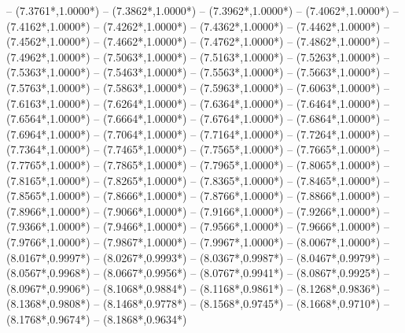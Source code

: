 {	-- ({7.3761*\dx},{1.0000*\dy})
	-- ({7.3862*\dx},{1.0000*\dy})
	-- ({7.3962*\dx},{1.0000*\dy})
	-- ({7.4062*\dx},{1.0000*\dy})
	-- ({7.4162*\dx},{1.0000*\dy})
	-- ({7.4262*\dx},{1.0000*\dy})
	-- ({7.4362*\dx},{1.0000*\dy})
	-- ({7.4462*\dx},{1.0000*\dy})
	-- ({7.4562*\dx},{1.0000*\dy})
	-- ({7.4662*\dx},{1.0000*\dy})
	-- ({7.4762*\dx},{1.0000*\dy})
	-- ({7.4862*\dx},{1.0000*\dy})
	-- ({7.4962*\dx},{1.0000*\dy})
	-- ({7.5063*\dx},{1.0000*\dy})
	-- ({7.5163*\dx},{1.0000*\dy})
	-- ({7.5263*\dx},{1.0000*\dy})
	-- ({7.5363*\dx},{1.0000*\dy})
	-- ({7.5463*\dx},{1.0000*\dy})
	-- ({7.5563*\dx},{1.0000*\dy})
	-- ({7.5663*\dx},{1.0000*\dy})
	-- ({7.5763*\dx},{1.0000*\dy})
	-- ({7.5863*\dx},{1.0000*\dy})
	-- ({7.5963*\dx},{1.0000*\dy})
	-- ({7.6063*\dx},{1.0000*\dy})
	-- ({7.6163*\dx},{1.0000*\dy})
	-- ({7.6264*\dx},{1.0000*\dy})
	-- ({7.6364*\dx},{1.0000*\dy})
	-- ({7.6464*\dx},{1.0000*\dy})
	-- ({7.6564*\dx},{1.0000*\dy})
	-- ({7.6664*\dx},{1.0000*\dy})
	-- ({7.6764*\dx},{1.0000*\dy})
	-- ({7.6864*\dx},{1.0000*\dy})
	-- ({7.6964*\dx},{1.0000*\dy})
	-- ({7.7064*\dx},{1.0000*\dy})
	-- ({7.7164*\dx},{1.0000*\dy})
	-- ({7.7264*\dx},{1.0000*\dy})
	-- ({7.7364*\dx},{1.0000*\dy})
	-- ({7.7465*\dx},{1.0000*\dy})
	-- ({7.7565*\dx},{1.0000*\dy})
	-- ({7.7665*\dx},{1.0000*\dy})
	-- ({7.7765*\dx},{1.0000*\dy})
	-- ({7.7865*\dx},{1.0000*\dy})
	-- ({7.7965*\dx},{1.0000*\dy})
	-- ({7.8065*\dx},{1.0000*\dy})
	-- ({7.8165*\dx},{1.0000*\dy})
	-- ({7.8265*\dx},{1.0000*\dy})
	-- ({7.8365*\dx},{1.0000*\dy})
	-- ({7.8465*\dx},{1.0000*\dy})
	-- ({7.8565*\dx},{1.0000*\dy})
	-- ({7.8666*\dx},{1.0000*\dy})
	-- ({7.8766*\dx},{1.0000*\dy})
	-- ({7.8866*\dx},{1.0000*\dy})
	-- ({7.8966*\dx},{1.0000*\dy})
	-- ({7.9066*\dx},{1.0000*\dy})
	-- ({7.9166*\dx},{1.0000*\dy})
	-- ({7.9266*\dx},{1.0000*\dy})
	-- ({7.9366*\dx},{1.0000*\dy})
	-- ({7.9466*\dx},{1.0000*\dy})
	-- ({7.9566*\dx},{1.0000*\dy})
	-- ({7.9666*\dx},{1.0000*\dy})
	-- ({7.9766*\dx},{1.0000*\dy})
	-- ({7.9867*\dx},{1.0000*\dy})
	-- ({7.9967*\dx},{1.0000*\dy})
	-- ({8.0067*\dx},{1.0000*\dy})
	-- ({8.0167*\dx},{0.9997*\dy})
	-- ({8.0267*\dx},{0.9993*\dy})
	-- ({8.0367*\dx},{0.9987*\dy})
	-- ({8.0467*\dx},{0.9979*\dy})
	-- ({8.0567*\dx},{0.9968*\dy})
	-- ({8.0667*\dx},{0.9956*\dy})
	-- ({8.0767*\dx},{0.9941*\dy})
	-- ({8.0867*\dx},{0.9925*\dy})
	-- ({8.0967*\dx},{0.9906*\dy})
	-- ({8.1068*\dx},{0.9884*\dy})
	-- ({8.1168*\dx},{0.9861*\dy})
	-- ({8.1268*\dx},{0.9836*\dy})
	-- ({8.1368*\dx},{0.9808*\dy})
	-- ({8.1468*\dx},{0.9778*\dy})
	-- ({8.1568*\dx},{0.9745*\dy})
	-- ({8.1668*\dx},{0.9710*\dy})
	-- ({8.1768*\dx},{0.9674*\dy})
	-- ({8.1868*\dx},{0.9634*\dy})
}
